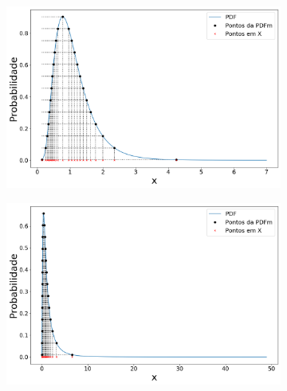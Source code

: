 \begin{figure}[H]
	\begin{subfigure}[b]{0.49\textwidth}
		\centering 
		\includegraphics[width=\textwidth]{./figuras/PDFm_lognormal_05}
		\caption{}
		\label{fig:pdflog050}
	\end{subfigure}
	\hfill
	\begin{subfigure}[b]{0.49\textwidth}
		\centering 
		\includegraphics[width=\textwidth]{./figuras/PDFm_lognormal_1}
		\caption{}
		\label{fig:pdflog100}
	\end{subfigure}
	

\end{figure}
